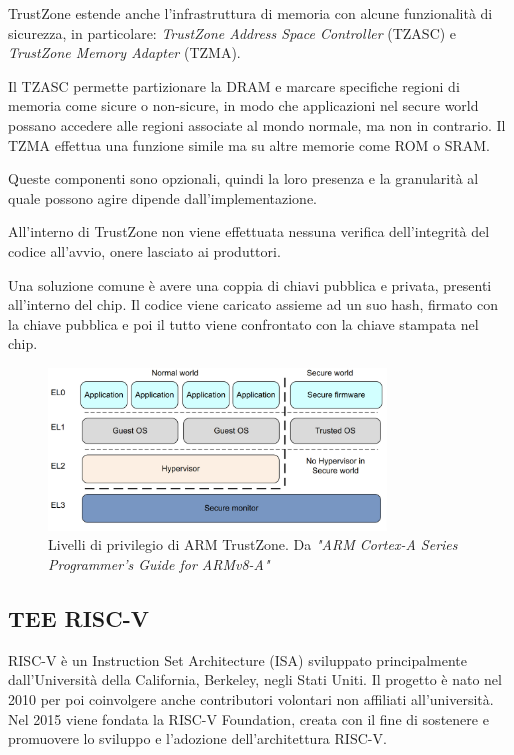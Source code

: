 \documentclass[12pt,italian]{report}
\begin{document}
	
	\bigbreak
	
	TrustZone estende anche l'infrastruttura di memoria con alcune funzionalità di sicurezza, in particolare: \textit{TrustZone Address Space Controller} (TZASC) e \textit{TrustZone Memory Adapter} (TZMA).
	
	Il TZASC permette partizionare la DRAM e marcare specifiche regioni di memoria come sicure o non-sicure, in modo che applicazioni nel secure world possano accedere alle regioni associate al mondo normale, ma non in contrario. Il TZMA effettua una funzione simile ma su altre memorie come ROM o SRAM.
	
	Queste componenti sono opzionali, quindi la loro presenza e la granularità al quale possono agire dipende dall'implementazione.
	
	\bigbreak 
	
	All'interno di TrustZone non viene effettuata nessuna verifica dell'integrità del codice all'avvio, onere lasciato ai produttori.
	
	Una soluzione comune è avere una coppia di chiavi pubblica e privata, presenti all'interno del chip. Il codice viene caricato assieme ad un suo hash, firmato con la chiave pubblica e poi il tutto viene confrontato con la chiave stampata nel chip.
	
	\begin{figure}[t]
		\centering
		\includegraphics[width=0.8\textwidth]{immagini/ARM_TZ_Levels}
		\caption{
			Livelli di privilegio di ARM TrustZone. Da \textit{"ARM Cortex-A Series Programmer's Guide for ARMv8-A"}
			\cite{arm_programmers_manual}
		}
		\label{fig:arm-exception-levels}
	\end{figure}
	
	\subsection{TEE RISC-V}
	\label{subsec:riscv}
	RISC-V è un Instruction Set Architecture (ISA) sviluppato principalmente dall'Università della California, Berkeley, negli Stati Uniti. Il progetto è nato nel 2010 per poi coinvolgere anche contributori volontari non affiliati all'università. Nel 2015 viene fondata la RISC-V Foundation, creata con il fine di sostenere e promuovere lo sviluppo e l'adozione dell'architettura RISC-V.
	
\end{document}
